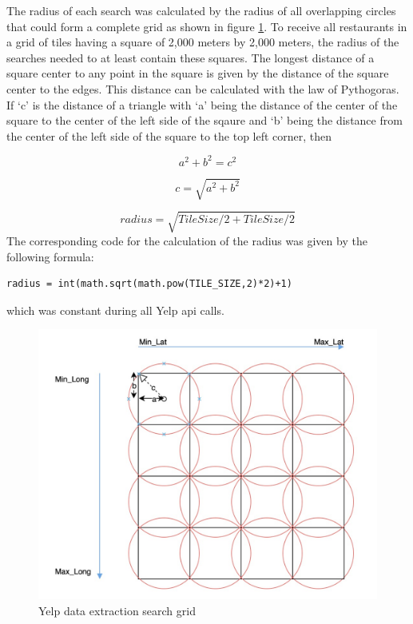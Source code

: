 \documentclass[a4paper, 11pt, oneside]{Thesis}  %
\begin{document}
The radius of each search was calculated by the radius of all overlapping circles that could form a complete grid as shown in figure \ref{fig:Yelp_extraction_grid}. To receive all restaurants in a grid of tiles having a square of 2,000 meters by 2,000 meters, the radius of the searches needed to at least contain these squares. The longest distance of a square center to any point in the square is given by the distance of the square center to the edges. This distance can be calculated with the law of Pythogoras. If `c' is the distance of a triangle with `a' being the distance of the center of the square to the center of the left side of the sqaure and `b' being the distance from the center of the left side of the square to the top left corner, then

\begin{equation}
 a^2 + b^2 = c^2
\end{equation}
 
\begin{equation}
 c = \sqrt{a^2+b^2}
\end{equation}
 
\begin{equation}
 radius = \sqrt{Tile Size/2 + Tile Size/2}
\end{equation}
The corresponding code for the calculation of the radius was given by the following formula:

\begin{verbatim}
radius = int(math.sqrt(math.pow(TILE_SIZE,2)*2)+1)
\end{verbatim}

which was constant during all Yelp \ac{api} calls.

\begin{figure}[h]
\includegraphics[scale=0.4]{Figures/Yelp_extraction_grid.jpeg}
\centering
\caption{Yelp data extraction search grid}
\label{fig:Yelp_extraction_grid}
\end{figure}
\end{document}
